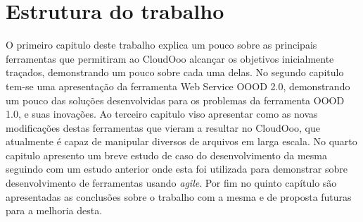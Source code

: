 \section{Estrutura do trabalho}
O primeiro capitulo deste trabalho explica um pouco sobre as principais ferramentas que permitiram ao CloudOoo alcançar os objetivos inicialmente traçados, demonstrando um pouco sobre cada uma delas.
No segundo capitulo tem-se uma apresentação da ferramenta Web Service OOOD 2.0, demonstrando um pouco das soluções desenvolvidas para os problemas da ferramenta OOOD 1.0, e suas inovações.
Ao terceiro capitulo viso apresentar como as novas modificações destas ferramentas que vieram a resultar no CloudOoo, que atualmente é capaz de manipular diversos de arquivos em larga escala. 
No quarto capitulo apresento um breve estudo de caso do desenvolvimento da mesma seguindo com um estudo anterior onde esta foi utilizada para demonstrar sobre desenvolvimento de ferramentas usando \textit{agile}.
Por fim no quinto capítulo são apresentadas as conclusões sobre o trabalho com a mesma e de proposta futuras para a melhoria desta.

